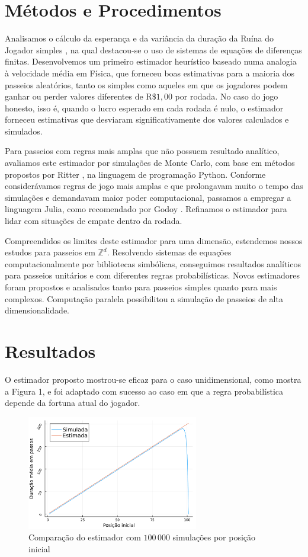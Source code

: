\documentclass[a4paper,10pt,twocolumn]{article}
\begin{document}
\section{Métodos e Procedimentos}

Analisamos o cálculo da esperança e da variância da duração da Ruína do Jogador
simples \cite{andel_variance_2012}, na qual destacou-se o uso de sistemas de
equações de diferenças finitas. Desenvolvemos um primeiro estimador heurístico
baseado numa analogia à velocidade média em Física, que forneceu boas
estimativas  para a maioria dos passeios aleatórios, tanto os simples como
aqueles em que os jogadores podem ganhar ou perder valores diferentes de
$\mathrm{R}\$1,00$ por rodada. No caso do jogo honesto, isso é, quando o lucro
esperado em cada rodada é nulo, o estimador forneceu estimativas que desviaram
significativamente dos valores calculados e simulados.

Para passeios com regras mais amplas que não possuem resultado analítico,
avaliamos este estimador por simulações de Monte Carlo, com base em métodos
propostos por Ritter \cite{ritter_determining_2011}, na linguagem de programação
Python. Conforme considerávamos regras de jogo mais amplas e que prolongavam
muito o tempo das simulações e demandavam maior poder computacional, passamos a
empregar a linguagem Julia, como recomendado por Godoy
\cite{godoy_evaluating_2023}. Refinamos o estimador para lidar com situações de
empate dentro da rodada.

Compreendidos os limites deste estimador para uma dimensão, estendemos nossos
estudos para passeios em $\mathbb{Z}^d$. Resolvendo sistemas de equações
computacionalmente por bibliotecas simbólicas, conseguimos resultados analíticos
para passeios unitários e com diferentes regras probabilísticas. Novos
estimadores foram propostos e analisados tanto para passeios simples quanto para
mais complexos. Computação paralela possibilitou a simulação de passeios de alta
dimensionalidade.

\section{Resultados}

O estimador proposto mostrou-se eficaz para o caso unidimensional, como mostra a
Figura 1, e foi adaptado com sucesso ao caso em que a regra probabilística
depende da fortuna atual do jogador.

\begin{figure}[H]
    \centering
    \includegraphics[width=7.5cm]{"graficoest.pdf"}
    \centering
    \caption{Comparação do estimador com $100\, 000$ simulações por posição inicial}
\end{figure}
\end{document}
